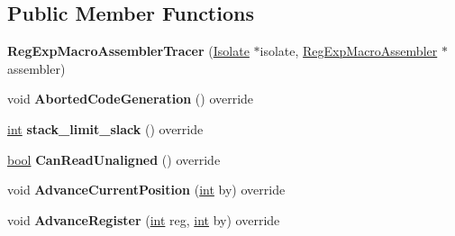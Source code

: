 \subsection*{Public Member Functions}
\begin{DoxyCompactItemize}
\item 
\mbox{\label{classv8_1_1internal_1_1RegExpMacroAssemblerTracer_a5088178e9104eec2f5336b04977cbde5}} 
{\bfseries Reg\+Exp\+Macro\+Assembler\+Tracer} (\mbox{\hyperlink{classv8_1_1internal_1_1Isolate}{Isolate}} $\ast$isolate, \mbox{\hyperlink{classv8_1_1internal_1_1RegExpMacroAssembler}{Reg\+Exp\+Macro\+Assembler}} $\ast$assembler)
\item 
\mbox{\label{classv8_1_1internal_1_1RegExpMacroAssemblerTracer_a9bf4651ef3079a884b483ec4b45cfc41}} 
void {\bfseries Aborted\+Code\+Generation} () override
\item 
\mbox{\label{classv8_1_1internal_1_1RegExpMacroAssemblerTracer_af0f960eea4ddae2122110d6a0221f5ef}} 
\mbox{\hyperlink{classint}{int}} {\bfseries stack\+\_\+limit\+\_\+slack} () override
\item 
\mbox{\label{classv8_1_1internal_1_1RegExpMacroAssemblerTracer_a00554f58de95a5d321fc4baacb7b75d7}} 
\mbox{\hyperlink{classbool}{bool}} {\bfseries Can\+Read\+Unaligned} () override
\item 
\mbox{\label{classv8_1_1internal_1_1RegExpMacroAssemblerTracer_a1ce374e849501446b20efc1ce9707248}} 
void {\bfseries Advance\+Current\+Position} (\mbox{\hyperlink{classint}{int}} by) override
\item 
\mbox{\label{classv8_1_1internal_1_1RegExpMacroAssemblerTracer_a0b278a007b21cc8bb47eb8c6d8ca450c}} 
void {\bfseries Advance\+Register} (\mbox{\hyperlink{classint}{int}} reg, \mbox{\hyperlink{classint}{int}} by) override
\item 
\mbox{\label{classv8_1_1internal_1_1RegExpMacroAssemblerTracer_ad08fb630289b0ad80a8ebf634967934b}} 

\end{DoxyCompactItemize}
